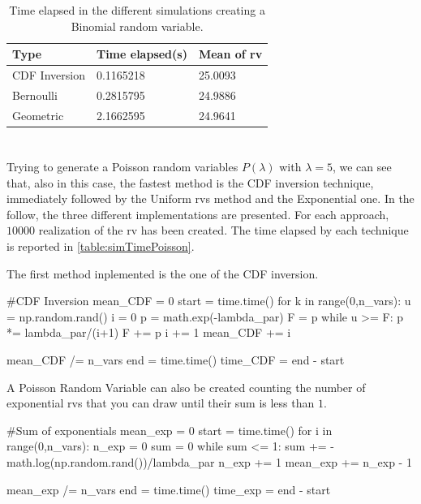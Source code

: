 \documentclass[11pt,a4paper]{article}
\begin{document}
\begin{table}[ht]
\small
	\centering
    \renewcommand{\arraystretch}{1}%
	\begin{tabular}{@{}lll@{}}
	\toprule
    Type & Time elapsed(s) & Mean of rv\\ \midrule
    CDF Inversion & 0.1165218 & 25.0093\\
    Bernoulli & 0.2815795 & 24.9886\\
    Geometric & 2.1662595 & 24.9641\\
    \bottomrule
    \end{tabular}
	\caption{Time elapsed in the different simulations creating a Binomial random variable.} 
	\label{table:simTime}
\end{table}


\section{}
Trying to generate a Poisson random variables $P(\lambda)$ with $\lambda = 5$, we can see that, also in this case, the fastest method is the CDF inversion technique, immediately followed by the Uniform rvs method and the Exponential one.
In the follow, the three different implementations are presented.
For each approach, $10000$ realization of the rv has been created. The time elapsed by each technique is reported in \autoref{table:simTimePoisson}.

The first method inplemented is the one of the CDF inversion.
\begin{python}
#CDF Inversion
mean_CDF = 0
start = time.time()
for k in range(0,n_vars):
    u = np.random.rand()
    i = 0
    p = math.exp(-lambda_par)
    F = p
    while u >= F:
        p *= lambda_par/(i+1)
        F += p
        i += 1
    mean_CDF += i

mean_CDF /= n_vars
end = time.time()
time_CDF = end - start
\end{python}

A Poisson Random Variable can also be created counting the number of exponential rvs that you can draw until their sum is less than $1$.
\begin{python}
#Sum of exponentials
mean_exp = 0
start = time.time()
for i in range(0,n_vars):
    n_exp = 0
    sum = 0
    while sum <= 1:
        sum += -math.log(np.random.rand())/lambda_par
        n_exp += 1
    mean_exp += n_exp - 1

mean_exp /= n_vars
end = time.time()
time_exp = end - start
\end{python}
\end{document}
